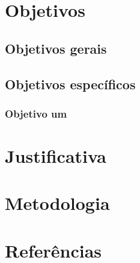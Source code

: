 \documentclass[12pt,nodisplayskipstretch]{article}
\begin{document}
\section{Objetivos}
\lipsum[1]

\subsection{Objetivos gerais}
\lipsum[1]

\subsection{Objetivos específicos}
\subsubsection{Objetivo um}
\lipsum[1]

\section{Justificativa}
\lipsum[1]

\section{Metodologia}
\lipsum[1]

\newpage
\section{Referências}
\vspace{-20mm}

\end{document}
